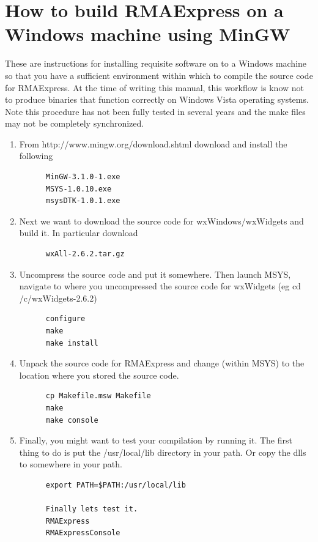 \documentclass[11pt]{report}
\begin{document}
\section{How to build RMAExpress on a Windows machine using MinGW}

These are instructions for installing requisite software on to a Windows machine so that you have a sufficient environment within which to compile the source code for RMAExpress. At the time of writing this manual, this workflow is know not to produce binaries that function correctly on Windows Vista operating systems. Note this procedure has not been fully tested in several years and the make files may not be completely synchronized.
\begin{enumerate}
\item From http://www.mingw.org/download.shtml download and install the following
\begin{verbatim}
      MinGW-3.1.0-1.exe
      MSYS-1.0.10.exe
      msysDTK-1.0.1.exe
\end{verbatim}
\item  Next we want to download the source code for wxWindows/wxWidgets and build it. In particular download
\begin{verbatim}
      wxAll-2.6.2.tar.gz
\end{verbatim}
\item      Uncompress the source code and put it somewhere. Then launch MSYS, navigate to where you uncompressed the source code for wxWidgets (eg cd /c/wxWidgets-2.6.2)
\begin{verbatim}
      configure
      make
      make install
\end{verbatim}
\item  Unpack the source code for RMAExpress and change (within MSYS) to the location where you stored the source code.
\begin{verbatim}
      cp Makefile.msw Makefile
      make
      make console
\end{verbatim}
\item Finally, you might want to test your compilation by running it. The first thing to do is put the /usr/local/lib directory in your path. Or copy the dlls to somewhere in your path.
\begin{verbatim}
      export PATH=$PATH:/usr/local/lib

      Finally lets test it.
      RMAExpress
      RMAExpressConsole 
\end{verbatim}
\end{enumerate}
\end{document}
